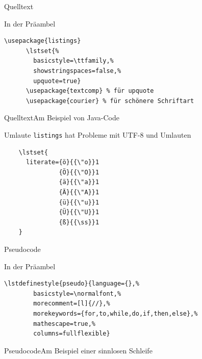 \begin{Frame}[fragile]{Quelltext}
  \begin{Block}{In der Präambel}
    \begin{lstlisting}[style=block,gobble=6]
      \usepackage{listings}
      \lstset{%
        basicstyle=\ttfamily,%
        showstringspaces=false,%
        upquote=true}
      \usepackage{textcomp} % für upquote
      \usepackage{courier} % für schönere Schriftart
    \end{lstlisting}
  \end{Block}
\end{Frame}

\begin{Frame}{Quelltext}{Am Beispiel von Java-Code}
  

  \xxx

  
\end{Frame}

\begin{Frame}[fragile]{Umlaute}
  \texttt{listings} hat Probleme mit UTF-8 und Umlauten
  \begin{lstlisting}[gobble=4]
    % german umlauts
    \lstset{
      literate={ö}{{\"o}}1
               {Ö}{{\"O}}1
               {ä}{{\"a}}1
               {Ä}{{\"A}}1
               {ü}{{\"u}}1
               {Ü}{{\"U}}1
               {ß}{{\ss}}1
    }
  \end{lstlisting}
\end{Frame}

\begin{Frame}[fragile]{Pseudocode}
  \begin{Block}{In der Präambel}
    \begin{lstlisting}[style=block,gobble=6]
      \lstdefinestyle{pseudo}{language={},%
        basicstyle=\normalfont,%
        morecomment=[l]{//},%
        morekeywords={for,to,while,do,if,then,else},%
        mathescape=true,%
        columns=fullflexible}
    \end{lstlisting}
  \end{Block}
\end{Frame}

\begin{Frame}{Pseudocode}{Am Beispiel einer sinnlosen Schleife}
  

  \xxx

  
\end{Frame}

